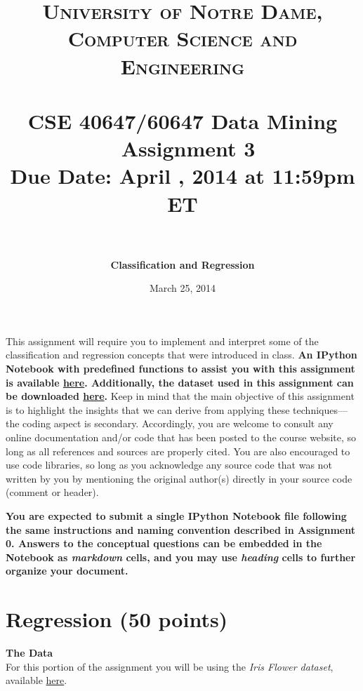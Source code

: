 \documentclass[paper=a4, fontsize=11pt]{scrartcl} %
\title{	
\normalfont \normalsize
\textsc{University of Notre Dame, Computer Science and Engineering} \\ [25pt] %
\horrule{0.5pt} \\[0.4cm] %
\huge CSE 40647/60647  Data Mining \textemdash~Assignment 3\\Due Date: April \nth{4}, 2014 at 11:59pm ET\\ %
\horrule{2pt} \\[0.5cm] %
}
\author{\textbf{Classification and Regression}} %
\date{\normalsize{March 25, 2014}} %
\numberwithin{equation}{section} %
\numberwithin{figure}{section} %
\numberwithin{table}{section} %
\begin{document}
\maketitle %


This assignment will require you to implement and interpret some of the classification and regression concepts that were introduced in class.  \textbf{An IPython Notebook with predefined functions to assist you with this assignment is available \href{http://nbviewer.ipython.org/github/cse40647/cse40647/blob/sp.14/assignment3/assignment3.ipynb}{here}. Additionally, the dataset used in this assignment can be downloaded  \href{https://github.com/cse40647/cse40647/blob/sp.14/assignment3/paintings.zip}{here}.} Keep in mind that the main objective of this assignment is to highlight the insights that we can derive from applying these techniques---the coding aspect is secondary. Accordingly, you are welcome to consult any online documentation and/or code that has been posted to the course website, so long as all references and sources are properly cited. You are also encouraged to use code libraries, so long as you acknowledge any source code that was not written by you by mentioning the original author(s) directly in your source code (comment or header).

\vspace{10pt}

\textbf{You are expected to submit a single IPython Notebook file following the same instructions and naming convention described in Assignment 0. Answers to the conceptual questions can be embedded in the Notebook as \textit{markdown} cells, and you may use \textit{heading} cells to further organize your document.}

\newpage

\section{Regression (50 points)}

\textbf{The Data}\\
For this portion of the assignment you will be using the \textit{Iris Flower dataset}, available \href{http://archive.ics.uci.edu/ml/machine-learning-databases/iris/iris.data}{here}.
\end{document}
